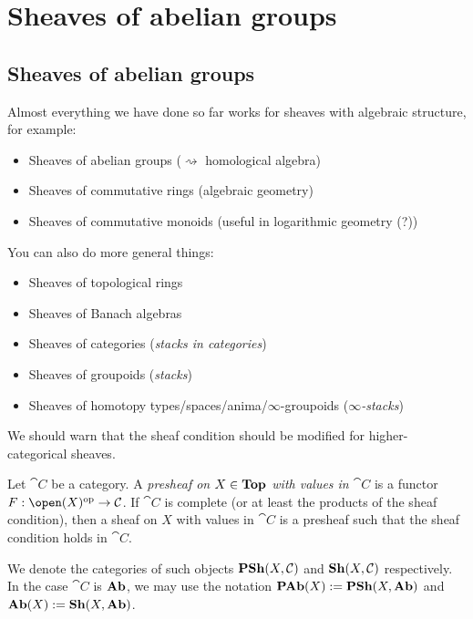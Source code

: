 \documentclass[../main.tex]{subfiles}
\begin{document}
\chapter{Sheaves of abelian groups}

\section{Sheaves of abelian groups}
\noindent
Almost everything we have done so far works for sheaves with algebraic structure, for example:
\begin{itemize}
    \item Sheaves of abelian groups ($\rightsquigarrow$ homological algebra)
    \item Sheaves of commutative rings (algebraic geometry)
    \item Sheaves of commutative monoids (useful in logarithmic geometry (?))
\end{itemize}
You can also do more general things:
\begin{itemize}[resume]
    \item Sheaves of topological rings
    \item Sheaves of Banach algebras
    \item Sheaves of categories (\emph{stacks in categories})
    \item Sheaves of groupoids (\emph{stacks})
    \item Sheaves of homotopy types/spaces/anima/\(\infty\)-groupoids (\emph{$\infty$-stacks})
\end{itemize}
We should warn that the sheaf condition should be modified for higher-categorical sheaves.

\begin{defn}
    Let $\cat C$ be a category. A \emph{presheaf on $X\in\mathbf{Top}$ with values in $\cat C$} is a functor $F\colon \open(X)\opp \to \cat C$. If $\cat C$ is complete (or at least the products of the sheaf condition), then a sheaf on $X$ with values in $\cat C$ is a presheaf such that the sheaf condition holds in $\cat C$. 
    
    We denote the categories of such objects $\operatorname{\mathbf{PSh}}(X, \mathcal{C})$ and $\operatorname{\mathbf{Sh}}(X, \mathcal{C})$ respectively. In the case $\cat C$ is $\mathbf{Ab}$, we may use the notation $\operatorname{\mathbf{PAb}}(X) := \operatorname{\mathbf{PSh}}(X, \mathbf{Ab})$ and $\operatorname{\mathbf{Ab}}(X) := \operatorname{\mathbf{Sh}}(X, \mathbf{Ab})$.
\end{defn}
\end{document}
